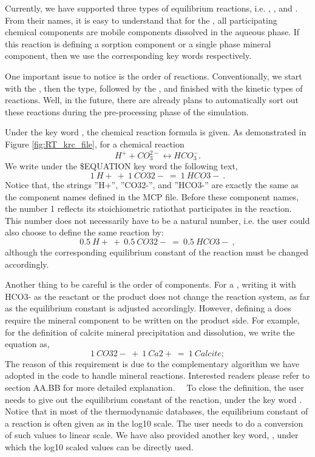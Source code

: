 Currently, we have supported three types of equilibrium reactions, i.e. , , and . From their names, it is easy to understand that for the , all participating chemical components are mobile components dissolved in the aqueous phase. If this reaction is defining a sorption component or a single phase mineral component, then we use the corresponding key words respectively. 

One important issue to notice is the order of reactions. Conventionally, we start with the , then the  type, followed by the , and finished with the kinetic types of reactions. Well, in the future, there are already plans to automatically sort out these reactions during the pre-processing phase of the simulation. 

Under the key word , the chemical reaction formula is given. As demonstrated in Figure \ref{fig:RT_krc_file}, for a chemical reaction 
$$ H^{+} + CO_3^{2-} \leftrightarrow HCO_3^{-} . $$
We write under the \$EQUATION key word the following text, 
$$ 1 ~ H+ ~ + ~ 1 ~ CO32- ~ = ~ 1 ~ HCO3- ~ . $$
Notice that, the strings ''H+'', ''CO32-'', and ''HCO3-'' are exactly the same as the component names defined in the MCP file. Before these component names, the number 1 reflects its stoichiometric ratiothat participates in the reaction. This number does not necessarily have to be a natural number, i.e. the user could also choose to define the same reaction by: 
$$ 0.5 ~ H+ ~ + ~ 0.5 ~ CO32- ~ = ~ 0.5 ~ HCO3- ~ , $$
although the corresponding equilibrium constant of the reaction must be changed accordingly. 

Another thing to be careful is the order of components. For a , writing it with HCO3- as the reactant or the product does not change the reaction system, as far as the equilibrium constant is adjusted accordingly. However, defining a  does require the mineral component to be written on the product side. For example, for the definition of calcite mineral precipitation and dissolution, we write the equation as, 
$$ 1 ~ CO32- ~ + ~ 1 ~ Ca2+ ~ = ~ 1 ~ Calcite; $$
The reason of this requirement is due to the complementary algorithm we have adopted in the code to handle mineral reactions. Interested readers please refer to section AA.BB for more detailed explanation. 
~\
To close the definition, the user needs to give out the equilibrium constant of the reaction, under the key word .  Notice that in most of the thermodynamic databases, the equilibrium constant of a reaction is often given as in the log10 scale. The user needs to do a conversion of such values to linear scale. We have also provided another key word, , under which the log10 scaled values can be directly used. 

